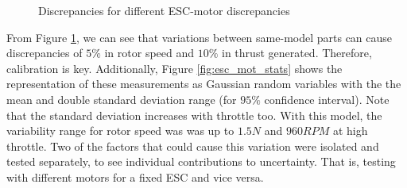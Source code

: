 \begin{figure}[!tbp]
  \centering
  \caption{Discrepancies for different ESC-motor discrepancies
  \label{fig:esc_discrepancies_overall}}
\end{figure}

From Figure \ref{fig:esc_discrepancies_overall}, we can see that variations between same-model parts can cause discrepancies of $5\%$ in rotor speed and $10\%$ in thrust generated. Therefore, calibration is key. Additionally, Figure \ref{fig:esc_mot_stats} shows the representation of these measurements as Gaussian random variables with the the mean and double standard deviation range (for $95\%$ confidence interval). Note that the standard deviation increases with throttle too. With this model, the variability range for rotor speed was was up to $1.5N$ and $960RPM$ at high throttle. Two of the factors that could cause this variation were isolated and tested separately, to see individual contributions to uncertainty. That is, testing with different motors for a fixed ESC and vice versa. 



